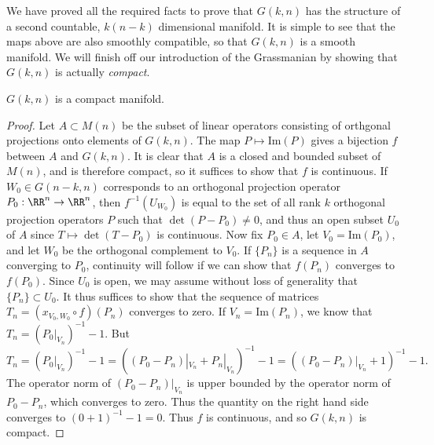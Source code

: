 We have proved all the required facts to prove that $G(k,n)$ has the structure of a second countable, $k(n-k)$ dimensional manifold. It is simple to see that the maps above are also smoothly compatible, so that $G(k,n)$ is a smooth manifold. We will finish off our introduction of the Grassmanian by showing that $G(k,n)$ is actually \emph{compact}.

\begin{lemma}
    $G(k,n)$ is a compact manifold.
\end{lemma}
\begin{proof}
    Let $A \subset M(n)$ be the subset of linear operators consisting of orthgonal projections onto elements of $G(k,n)$. The map $P \mapsto \text{Im}(P)$ gives a bijection $f$ between $A$ and $G(k,n)$. It is clear that $A$ is a closed and bounded subset of $M(n)$, and is therefore compact, so it suffices to show that $f$ is continuous. If $W_0 \in G(n-k,n)$ corresponds to an orthogonal projection operator $P_0: \RR^n \to \RR^n$, then $f^{-1}(U_{W_0})$ is equal to the set of all rank $k$ orthogonal projection operators $P$ such that $\det(P - P_0) \neq 0$, and thus an open subset $U_0$ of $A$ since $T \mapsto \det(T-P_0)$ is continuous. Now fix $P_0 \in A$, let $V_0 = \text{Im}(P_0)$, and let $W_0$ be the orthogonal complement to $V_0$. If $\{ P_n \}$ is a sequence in $A$ converging to $P_0$, continuity will follow if we can show that $f(P_n)$ converges to $f(P_0)$. Since $U_0$ is open, we may assume without loss of generality that $\{ P_n \} \subset U_0$. It thus suffices to show that the sequence of matrices $T_n = (x_{V_0,W_0} \circ f)(P_n)$ converges to zero. If $V_n = \text{Im}(P_n)$, we know that $T_n = (P_0|_{V_n})^{-1} - 1$. But
    \[ T_n = (P_0|_{V_n})^{-1} - 1 = ((P_0 - P_n)|_{V_n} + P_n|_{V_n})^{-1} - 1 = ((P_0 - P_n)|_{V_n} + 1)^{-1} - 1. \]
    The operator norm of $(P_0 - P_n)|_{V_n}$ is upper bounded by the operator norm of $P_0 - P_n$, which converges to zero. Thus the quantity on the right hand side converges to $(0 + 1)^{-1} - 1 = 0$. Thus $f$ is continuous, and so $G(k,n)$ is compact.
\end{proof}


